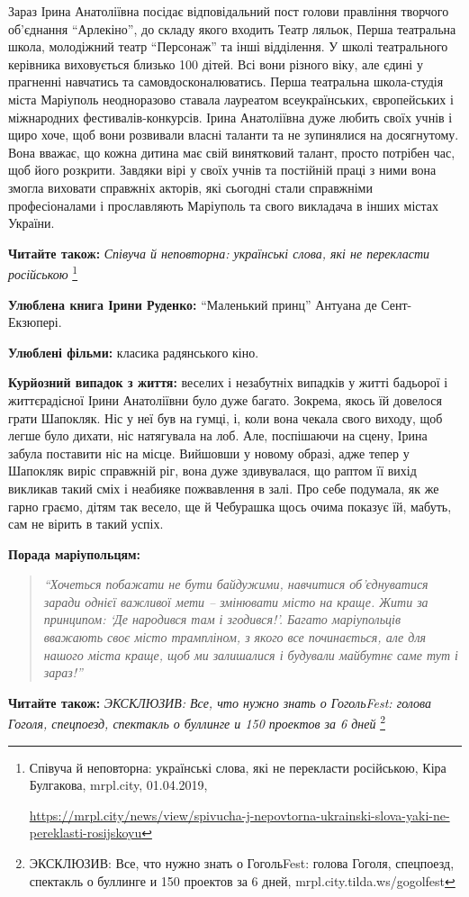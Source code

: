 Зараз Ірина Анатоліївна посідає відповідальний пост голови правління творчого
об'єднання \enquote{Арлекіно}, до складу якого входить Театр ляльок, Перша театральна
школа, молодіжний театр \enquote{Персонаж} та інші відділення. У школі театрального
керівника виховується близько 100 дітей. Всі вони різного віку, але єдині у
прагненні навчатись та самовдосконалюватись. Перша театральна школа-студія
міста Маріуполь неодноразово ставала лауреатом всеукраїнських, європейських і
міжнародних фестивалів-конкурсів. Ірина Анатоліївна дуже любить своїх учнів і
щиро хоче, щоб вони розвивали власні таланти та не зупинялися на досягнутому.
Вона вважає, що кожна дитина має свій винятковий талант, просто потрібен час,
щоб його розкрити. Завдяки вірі у своїх учнів та постійній праці з ними вона
змогла виховати справжніх акторів, які сьогодні стали справжніми професіоналами
і прославляють Маріуполь та свого викладача в інших містах України.


\textbf{Читайте також:} \emph{Співуча й неповторна: українські слова, які не перекласти російською}%
\footnote{Співуча й неповторна: українські слова, які не перекласти російською, Кіра Булгакова, mrpl.city, 01.04.2019, \par%
\url{https://mrpl.city/news/view/spivucha-j-nepovtorna-ukrainski-slova-yaki-ne-pereklasti-rosijskoyu}
}

\textbf{Улюблена книга Ірини Руденко:} \enquote{Маленький принц} Антуана де Сент-Екзюпері.

\textbf{Улюблені фільми:} класика радянського кіно.

\textbf{Курйозний випадок з життя:} веселих і незабутніх випадків у житті
бадьорої і життєрадісної Ірини Анатоліївни було дуже багато. Зокрема, якось їй
довелося грати Шапокляк. Ніс у неї був на гумці, і, коли вона чекала свого
виходу, щоб легше було дихати, ніс натягувала на лоб. Але, поспішаючи на сцену,
Ірина забула поставити ніс на місце. Вийшовши у новому образі, адже тепер у
Шапокляк виріс справжній ріг, вона дуже здивувалася, що раптом її вихід
викликав такий сміх і неабияке пожвавлення в залі. Про себе подумала, як же
гарно граємо, дітям так весело, ще й Чебурашка щось очима показує їй, мабуть,
сам не вірить в такий успіх.


\textbf{Порада маріупольцям:} 
\begin{quote}
\em\enquote{Хочеться побажати не бути байдужими, навчитися
об'єднуватися заради однієї важливої мети – змінювати місто на краще. Жити за
принципом: \enquote{Де народився там і згодився!}. Багато маріупольців вважають своє
місто трампліном, з якого все починається, але для нашого міста краще, щоб ми
залишалися і будували майбутнє саме тут і зараз!}
\end{quote}

\textbf{Читайте також:} \emph{ЭКСКЛЮЗИВ: Все, что нужно знать о ГогольFest: голова Гоголя, спецпоезд, спектакль о буллинге и 150 проектов за 6 дней}%
\footnote{ЭКСКЛЮЗИВ: Все, что нужно знать о ГогольFest: голова Гоголя, спецпоезд, спектакль о буллинге и 150 проектов за 6 дней, mrpl.city.tilda.ws/gogolfest}

